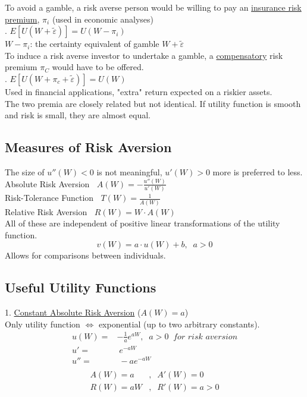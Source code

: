 \documentclass[
14pt,notheorems,hyperref={pdfauthor=whatever}
]{beamer}
\begin{document}
\begin{frame}
To avoid a gamble, a risk averse person would be willing to pay an \underline{insurance risk premium}, $\pi_i$ (used in economic analyses)\\
\hfill {}. $E[U(W+\tilde\varepsilon)] = U(W-\pi_i)$\\
\hfill \break
$W-\pi_i$: the certainty equivalent of gamble $W+\tilde\varepsilon$\\
To induce a risk averse investor to undertake a gamble, a \underline{compensatory} risk premium $\pi_C$ would have to be offered.\\
\hfill {}. $E[U(W+\pi_c+\tilde\varepsilon)] = U(W)$\\
\hfill \break
Used in financial applications, "extra" return expected on a riskier assets.\\
\hfill \break
The two premia are closely related but not identical. If utility function is smooth and risk is small, they are almost equal.\\
\end{frame}

\subsection{Measures of Risk Aversion}
\begin{frame}
The size of $u''(W)<0$ is not meaningful, $u'(W)>0$ more is preferred to less.\\
\hfill \break
Absolute Risk Aversion $\;\;A(W) = -\frac{u''(W)}{u'(W)}$\\
\hfill \break
Risk-Tolerance Function $\;\;T(W) = \frac{1}{A(W)}$\\
\hfill \break
Relative Risk Aversion $\;\;R(W) = W\cdot A(W)$\\
\hfill \break
All of these are independent of positive linear transformations of the utility function.\\
\[v(W)=a\cdot u(W)+b,\;\;a>0\]
Allows for comparisons between individuals.
\end{frame}

\subsection{Useful Utility Functions}
\begin{frame}
1. \underline{Constant Absolute Risk Aversion} ($A(W) = a$)\\
Only utility function $\iff$ exponential (up to two arbitrary constants).
\hfill \break
\begin{align*}
    u(W) =& -\frac{1}{a} e^{aW},\;\;a>0 \;\;\textit{for risk aversion}\\
    u' =& \;e^{-aW}\\
    u''=&\;-ae^{-aW}\\
\end{align*}
\begin{align*}
    A(W) = a&,\;\;A'(W) = 0\\
    R(W) = aW&,\;\;R'(W) = a > 0\\
\end{align*}
\end{frame}
\end{document}
